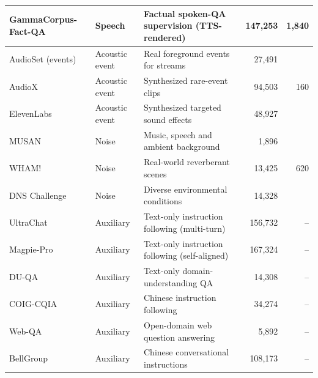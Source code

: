 \documentclass{article}
\begin{document}
\begin{table}[h]
\begin{tabularx}{\linewidth}{@{}l l X r r@{}}
GammaCorpus-Fact-QA   & Speech         & Factual spoken-QA supervision (TTS-rendered)      & 147{,}253 & 1{,}840 \\
\midrule
AudioSet (events)     & Acoustic event & Real foreground events for streams                & 27{,}491  & \multirow{3}{*}{160} \\
AudioX                & Acoustic event & Synthesized rare-event clips                      & 94{,}503  &     \\
ElevenLabs            & Acoustic event & Synthesized targeted sound effects                & 48{,}927  &     \\
\midrule
MUSAN                 & Noise          & Music, speech and ambient background              & 1{,}896   & \multirow{3}{*}{620} \\
WHAM!                 & Noise          & Real-world reverberant scenes                     & 13{,}425  &     \\
DNS Challenge         & Noise          & Diverse environmental conditions                  & 14{,}328  &     \\
\midrule
UltraChat             & Auxiliary      & Text-only instruction following (multi-turn)      & 156{,}732 & --  \\
Magpie-Pro            & Auxiliary      & Text-only instruction following (self-aligned)    & 167{,}324 & --  \\
DU-QA                 & Auxiliary      & Text-only domain-understanding QA                 & 14{,}308  & --  \\
COIG-CQIA             & Auxiliary      & Chinese instruction following                     & 34{,}274  & --  \\
Web-QA                & Auxiliary      & Open-domain web question answering                & 5{,}892   & --  \\
BellGroup             & Auxiliary      & Chinese conversational instructions               & 108{,}173 & --  \\
\bottomrule
\end{tabularx}
\end{table}
\end{document}
